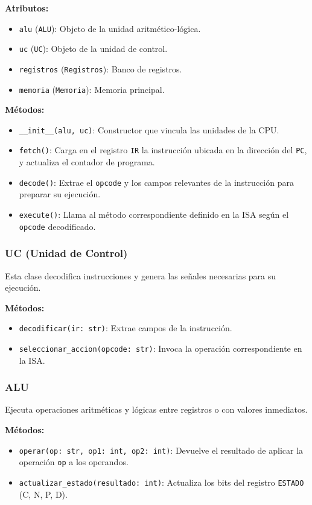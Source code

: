 \documentclass{article}
\begin{document}
\textbf{Atributos:}
\begin{itemize}
  \item \texttt{alu} (\texttt{ALU}): Objeto de la unidad aritmético-lógica.
  \item \texttt{uc} (\texttt{UC}): Objeto de la unidad de control.
  \item \texttt{registros} (\texttt{Registros}): Banco de registros.
  \item \texttt{memoria} (\texttt{Memoria}): Memoria principal.
\end{itemize}

\textbf{Métodos:}
\begin{itemize}
  \item \texttt{\_\_init\_\_(alu, uc)}: Constructor que vincula las unidades de la CPU.
  \item \texttt{fetch()}: Carga en el registro \texttt{IR} la instrucción ubicada en la
        dirección del \texttt{PC}, y actualiza el contador de programa.
  \item \texttt{decode()}: Extrae el \texttt{opcode} y los campos relevantes de
        la instrucción para preparar su ejecución.
  \item \texttt{execute()}: Llama al método correspondiente definido en la ISA
        según el \texttt{opcode} decodificado.
\end{itemize}

\subsubsection*{UC (Unidad de Control)}

Esta clase decodifica instrucciones y genera las señales necesarias para su ejecución.

\textbf{Métodos:}
\begin{itemize}
  \item \texttt{decodificar(ir: str)}: Extrae campos de la instrucción.
  \item \texttt{seleccionar\_accion(opcode: str)}: Invoca la operación correspondiente en la ISA.
\end{itemize}

\subsubsection*{ALU}

Ejecuta operaciones aritméticas y lógicas entre registros o con valores inmediatos.

\textbf{Métodos:}
\begin{itemize}
  \item \texttt{operar(op: str, op1: int, op2: int)}: Devuelve el resultado de aplicar
        la operación \texttt{op} a los operandos.
  \item \texttt{actualizar\_estado(resultado: int)}: Actualiza los bits del
        registro \texttt{ESTADO} (C, N, P, D).
\end{itemize}
\end{document}
